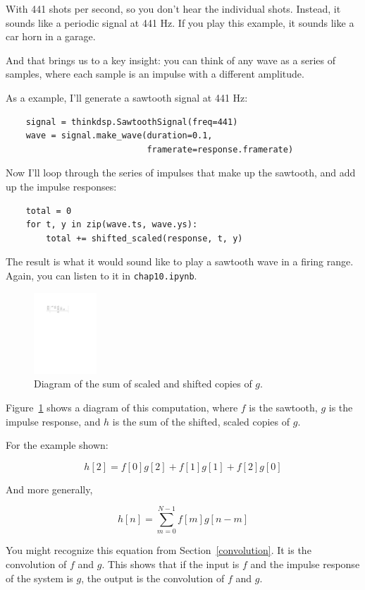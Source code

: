 \documentclass[12pt]{book}
\begin{document}
With 441 shots per second,
so you don't hear the individual shots.  Instead, it sounds
like a periodic signal at 441 Hz.  If you play this example, it
sounds like a car horn in a garage.

And that brings us to a key insight: you can think of any wave as a
series of samples, where each sample is an impulse with a different
amplitude.

As a example, I'll generate a sawtooth signal at 441 Hz:

\begin{verbatim}
    signal = thinkdsp.SawtoothSignal(freq=441)
    wave = signal.make_wave(duration=0.1,
                            framerate=response.framerate)
\end{verbatim}

Now I'll loop through the series of impulses that make up the
sawtooth, and add up the impulse responses:

\begin{verbatim}
    total = 0
    for t, y in zip(wave.ts, wave.ys):
        total += shifted_scaled(response, t, y)
\end{verbatim}

The result is what it would sound like to play a sawtooth wave in a
firing range.  Again, you can listen to it in {\tt chap10.ipynb}.

\begin{figure}
\centerline{\includegraphics[height=1.2in]{figs/diagram2.pdf}}
\caption{Diagram of the sum of scaled and shifted copies of $g$.}
\label{fig.convolution}
\end{figure}

Figure~\ref{fig.convolution} shows a diagram of this computation,
where $f$ is the sawtooth, $g$ is the impulse response, and $h$
is the sum of the shifted, scaled copies of $g$.

For the example shown:

\[ h[2] = f[0]g[2] + f[1]g[1] + f[2]g[0]  \]

And more generally,

\[ h[n] = \sum_{m=0}^{N-1} f[m] g[n-m]  \]

You might recognize this equation from Section~\ref{convolution}.  It
is the convolution of $f$ and $g$.  This shows that if the input is $f$
and the impulse response of the system is $g$, the output is the
convolution of $f$ and $g$.
\end{document}

